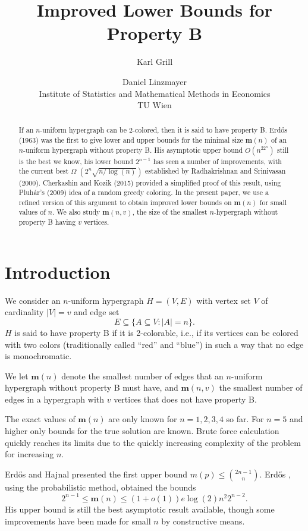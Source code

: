 \documentclass[a4paper,12pt]{article}
\title{Improved Lower Bounds  for Property B}
\author{Karl Grill \and Daniel Linzmayer%
\\Institute of Statistics and Mathematical Methods in Economics\\TU Wien}
\begin{document}
\maketitle
\begin{abstract}
If an $n$-uniform hypergraph can be 2-colored, then it is 
said to have property B. Erdős (1963) was the
first to give lower and upper bounds for
 the minimal size $\mathbf m(n)$ of an $n$-uniform  hypergraph without
property B. His asymptotic upper bound $O(n^22^n)$ still is the best
we know, his lower bound $2^{n-1}$ has seen a number of 
improvements, with the current best 
$\Omega$ $(2^n\sqrt{n/\log(n)})$ 
established by  Radhakrishnan 
and Srinivasan (2000).
Cherkashin and Kozik (2015) provided a simplified proof
of this result, using Pluhár's (2009) idea of a random 
greedy coloring. In the present paper, we use a refined version of
this argument to obtain improved lower bounds on $\mathbf m(n)$ for small values of $n$.
We also study $\mathbf m(n,v)$, the size of the smallest $n$-hypergraph without
property B having $v$ vertices.
\end{abstract}


\section{Introduction}

We consider an $n$-uniform hypergraph $H=(V,E)$ with vertex set $V$ of
cardinality $|V|=v$ and edge set 
\[E\subseteq \{A\subseteq V:|A|=n\}.\]
$H$ is said to have property B if it is  2-colorable, i.e., if its vertices
can be colored with two colors (traditionally called ``red'' and ``blue'')
in such a way that no edge is monochromatic. 

We let $\mathbf  m(n)$ denote the smallest number of edges that an $n$-uniform 
hypergraph without property B must have, and $\mathbf m(n,v)$ the smallest number
of edges in a hypergraph with $v$ vertices that does not have property B.


The exact values of $\mathbf m(n)$ are only known for $n = 1, 2, 3, 4$ so far. 
For $n=5$ and higher only bounds for the true solution are 
known\cite{oester}. Brute force calculation quickly reaches its limits due to 
the quickly increasing complexity of the problem for increasing $n$.

Erdős and Hajnal \cite{erdhaj} presented the first upper bound
$m(p)\le \genfrac(){0pt}1{2n-1}{n}.$
Erdős \cite{erdos}, using the probabilistic method, obtained the bounds
\begin{equation}\label{erdosupper}
2^{n-1}\le \mathbf m(n) \leq (1 + o(1)) e \log(2) n^2 2^{n-2}.\end{equation}
His upper bound is still the best asymptotic result available, though some
improvements have been made for small $n$ by constructive means.
\end{document}
